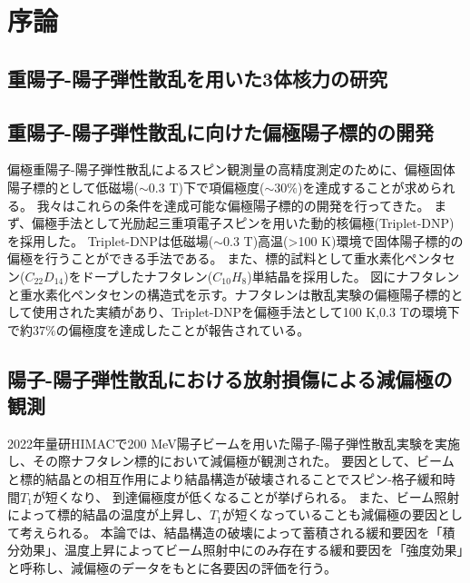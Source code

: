 \chapter{序論}

\section{重陽子-陽子弾性散乱を用いた3体核力の研究}
\section{重陽子-陽子弾性散乱に向けた偏極陽子標的の開発}
偏極重陽子-陽子弾性散乱によるスピン観測量の高精度測定のために、偏極固体陽子標的として低磁場($\sim 0.3$ T)下で項偏極度($\sim 30\%$)を達成することが求められる。
我々はこれらの条件を達成可能な偏極陽子標的の開発を行ってきた。
まず、偏極手法として光励起三重項電子スピンを用いた動的核偏極(Triplet-DNP)を採用した。
Triplet-DNPは低磁場($\sim 0.3$ T)高温(>100 K)環境で固体陽子標的の偏極を行うことができる手法である。
また、標的試料として重水素化ペンタセン($C_{22}D_{14}$)をドープしたナフタレン($C_{10}H_8$)単結晶を採用した。
図にナフタレンと重水素化ペンタセンの構造式を示す。ナフタレンは散乱実験の偏極陽子標的として使用された実績があり、Triplet-DNPを偏極手法として100 K,0.3 Tの環境下で約$37\%$の偏極度を達成したことが報告されている。\\

\section{陽子-陽子弾性散乱における放射損傷による減偏極の観測}
2022年量研HIMACで200 MeV陽子ビームを用いた陽子-陽子弾性散乱実験を実施し、その際ナフタレン標的において減偏極が観測された。
要因として、ビームと標的結晶との相互作用により結晶構造が破壊されることでスピン-格子緩和時間$T_1$が短くなり、
到達偏極度が低くなることが挙げられる。
また、ビーム照射によって標的結晶の温度が上昇し、$T_1$が短くなっていることも減偏極の要因として考えられる。
本論では、結晶構造の破壊によって蓄積される緩和要因を「積分効果」、温度上昇によってビーム照射中にのみ存在する緩和要因を「強度効果」と呼称し、減偏極のデータをもとに各要因の評価を行う。

